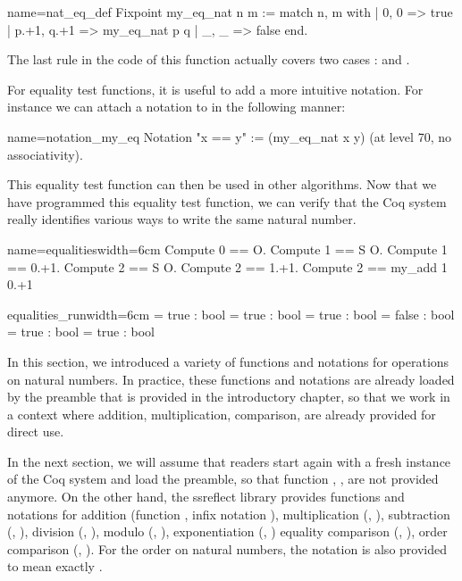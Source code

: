 \begin{coq}{name=nat_eq_def}{}
Fixpoint my_eq_nat n m :=
  match n, m with
  | 0, 0 => true
  | p.+1, q.+1 => my_eq_nat p q
  | _, _ => false
  end.
\end{coq}
The last rule in the code of this function actually covers two cases :
 and .

For equality test functions, it is useful to add a more intuitive
notation.  For instance we can attach a notation to  in
the following manner:

\begin{coq}{name=notation_my_eq}{}
Notation "x == y" := (my_eq_nat x y)
  (at level 70, no associativity).
\end{coq}
This equality test function can then be used in other algorithms.  Now
that we have programmed this equality test function, we can verify
that the Coq system really identifies various ways to write the same
natural number.

\begin{coq}{name=equalities}{width=6cm}
Compute 0 == O.
Compute 1 == S O.
Compute 1 == 0.+1.
Compute 2 == S O.
Compute 2 == 1.+1.
Compute 2 == my_add 1 0.+1
\end{coq}
\begin{coqout}{equalities_run}{width=6cm}
= true : bool
= true : bool
= true : bool
= false : bool
= true : bool
= true : bool
\end{coqout}

In this section, we introduced a variety of functions and notations
for operations on natural numbers.  In practice, these functions and
notations are already loaded by the preamble that is provided in the
introductory chapter, so that we work in a context where addition,
multiplication, comparison, are already provided for direct use.

In
the next section, we will assume that readers start again with 
a fresh instance of the Coq system and load the preamble, so that
function , ,  are not provided
anymore.  On the other hand, the ssreflect library provides functions
and notations for addition (function , infix
notation \C{+}), multiplication
(, \C{*}), subtraction (, \C{-}), division (,
\C{\%/}),  modulo (, \C{\%\%}), exponentiation (, \C{\^})
equality comparison (, \C{==}), order
 comparison (, \C{<=}).  For the order on natural numbers,
the notation  is also provided to mean exactly .


